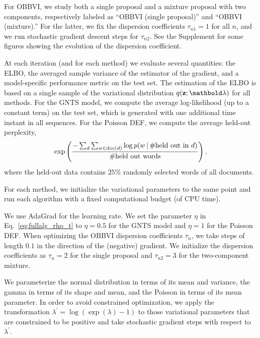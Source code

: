 For \gls{OBBVI}, we study both a single proposal and a mixture
proposal with two components, respectively labeled as
``\gls{OBBVI} (single proposal)'' and ``\gls{OBBVI} (mixture).''
For the latter, we fix the dispersion coefficients $\tau_{n1}=1$
for all $n$, and we run stochastic gradient descent steps
for $\tau_{n2}$. See the Supplement for some figures showing
the evolution of the dispersion coefficient.

At each iteration (and for each method) we evaluate several
quantities: the \gls{ELBO}, the averaged sample variance of the
estimator of the gradient, and a model-specific performance metric on
the test set. The estimation of the \gls{ELBO} is based on a single
sample of the variational distribution $q(\bz;\blambda)$ for all
methods.
%
For the \gls{GNTS} model, we compute the average log-likelihood (up to
a constant term) on the test set, which is generated with one
additional time instant in all sequences. For the Poisson \gls{DEF},
we compute the average held-out perplexity, \begin{equation}
  \exp\left(\frac{-\sum_{d}\sum_{w\in \textrm{doc}(d)} \log p(w\, | \, \#\textrm{held out in } d)}{\# \textrm{held out words}}\right),
\end{equation}
where the held-out data contains $25\%$ randomly selected words of
all documents.

 For each method, we initialize the
variational parameters to the same point and run each algorithm with a
fixed computational budget (of CPU time).

We use AdaGrad \citep{Duchi2011} for the learning rate. We set the
parameter $\eta$ in Eq.~\ref{eq:fullalg_rho_t} to $\eta=0.5$ for the
\gls{GNTS} model and $\eta=1$ for the Poisson \gls{DEF}. When
optimizing the \gls{OBBVI} dispersion coefficients $\tau_n$, we
take steps of length $0.1$ in the direction of the (negative) gradient.
We initialize the dispersion coefficients as $\tau_n=2$ for the single
proposal and $\tau_{n2}=3$ for the two-component mixture.

We parameterize the normal distribution in terms of its mean and
variance, the gamma in terms of its shape and mean, and the Poisson in
terms of its mean parameter. In order to avoid constrained
optimization, we apply the transformation
$\lambda^\prime=\log(\exp(\lambda)-1)$ to those variational parameters
that are constrained to be positive and take stochastic gradient
steps with respect to $\lambda^\prime$.

